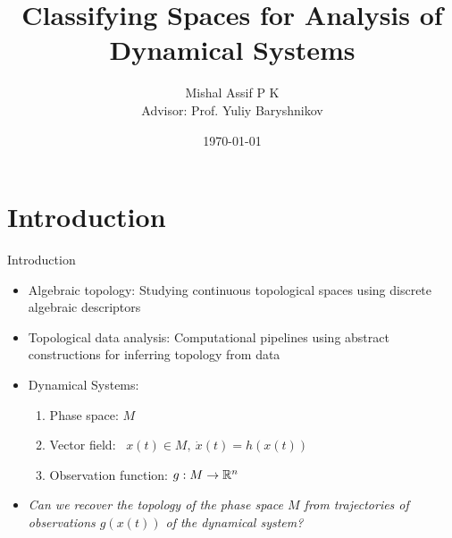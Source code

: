 \documentclass{beamer}
\title[Classifying Spaces]{Classifying Spaces for Analysis of Dynamical Systems}
\author[Mishal Assif]{Mishal Assif P K \\ Advisor: Prof. Yuliy Baryshnikov}
\institute[ECE]{Electrical and Computer Engineering, UIUC}
\date{\today}
\begin{document}
\begin{frame}
    \titlepage
\end{frame}


\section{Introduction}
\begin{frame}{Introduction}
    \begin{itemize}
        \item Algebraic topology: Studying continuous topological spaces using discrete algebraic descriptors %
        \item Topological data analysis: Computational pipelines using abstract constructions
            for inferring topology from data \pause
        \item Dynamical Systems: 
            \begin{enumerate}
                \item Phase space: $M$ 
                \item Vector field: \ $x(t) \in M, \ \dot{x}(t) = h(x(t))$
                \item Observation function: $g : M \rightarrow \mathbb{R}^n$
    \end{enumerate}
    \pause
\item \textit{Can we recover the topology of the phase space $M$ from trajectories of observations $g(x(t))$ of the dynamical system?}
    \end{itemize}
\end{frame}
\end{document}

